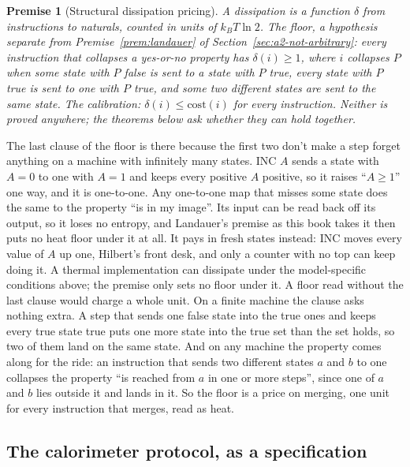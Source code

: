 \documentclass[11pt,twoside]{article}
\theoremstyle{thielethm}
\theoremstyle{thieledef}
\theoremstyle{thieledef}
\theoremstyle{thieledef}
\newtheorem{premise}[definition]{Premise}
\theoremstyle{thielethm}
\theoremstyle{thieleobs}
\theoremstyle{thielethm}
\begin{document}
\begin{premise}[Structural dissipation pricing]\label{prem:u24-landauer-pair}
A \emph{dissipation} is a function $\delta$ from instructions to naturals, counted in units of
$k_B T \ln 2$. The \emph{floor}, a hypothesis separate from Premise~\ref{prem:landauer} of
Section~\ref{sec:a2-not-arbitrary}:
every instruction that collapses a yes-or-no property has $\delta(i) \ge 1$, where $i$
\emph{collapses} $P$ when some state with $P$ false is sent to a state with $P$ true, every
state with $P$ true is sent to one with $P$ true, and some two different states are sent to the
same state. The \emph{calibration}: $\delta(i) \le
\mathrm{cost}(i)$ for every instruction. Neither is proved anywhere; the theorems below ask
whether they can hold together.
\end{premise}

The last clause of the floor is there because the first two don't make a step forget anything
on a machine with infinitely many states. INC $A$ sends a state with $A = 0$ to one with $A = 1$
and keeps every positive $A$ positive, so it raises ``$A \ge 1$'' one way, and it is
one-to-one. Any one-to-one map that misses some state does the same to the property ``is in my
image''. Its input can be read back off its output, so it loses no entropy, and Landauer's premise as
this book takes it then puts no heat floor under it at all. It pays in fresh states instead: INC moves
every value of $A$ up one, Hilbert's front desk, and only a counter with no top can keep doing
it. A thermal implementation can dissipate under the model-specific conditions above; the premise only sets no floor under it. A floor read without the last clause would charge a whole unit. On a finite machine the clause asks
nothing extra. A step that sends one false state into the true ones and keeps every true state true
puts one more state into the true set than the set holds, so two of them land on the same state. And on any machine the property comes along for the ride: an instruction that sends two different states $a$ and $b$ to one collapses the property ``is reached from $a$ in one or more steps'', since one of $a$ and $b$ lies outside it and lands in it. So the floor is a price on merging, one unit for every instruction that merges, read as heat.


\subsection{The calorimeter protocol, as a specification}
\end{document}
